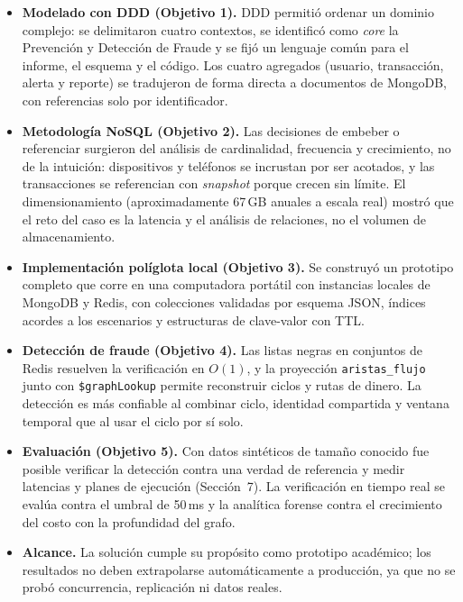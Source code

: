 \documentclass[11pt,a4paper]{article}
\begin{document}
	\begin{itemize}[leftmargin=2em]
		\item \textbf{Modelado con DDD (Objetivo 1).} DDD permitió ordenar un dominio complejo: se delimitaron cuatro contextos, se identificó como \textit{core} la Prevención y Detección de Fraude y se fijó un lenguaje común para el informe, el esquema y el código. Los cuatro agregados (usuario, transacción, alerta y reporte) se tradujeron de forma directa a documentos de MongoDB, con referencias solo por identificador.
		\item \textbf{Metodología NoSQL (Objetivo 2).} Las decisiones de embeber o referenciar surgieron del análisis de cardinalidad, frecuencia y crecimiento, no de la intuición: dispositivos y teléfonos se incrustan por ser acotados, y las transacciones se referencian con \textit{snapshot} porque crecen sin límite. El dimensionamiento (aproximadamente 67\,GB anuales a escala real) mostró que el reto del caso es la latencia y el análisis de relaciones, no el volumen de almacenamiento.
		\item \textbf{Implementación políglota local (Objetivo 3).} Se construyó un prototipo completo que corre en una computadora portátil con instancias locales de MongoDB y Redis, con colecciones validadas por esquema JSON, índices acordes a los escenarios y estructuras de clave-valor con TTL.
		\item \textbf{Detección de fraude (Objetivo 4).} Las listas negras en conjuntos de Redis resuelven la verificación en $O(1)$, y la proyección \texttt{aristas\_flujo} junto con \texttt{\$graphLookup} permite reconstruir ciclos y rutas de dinero. La detección es más confiable al combinar ciclo, identidad compartida y ventana temporal que al usar el ciclo por sí solo.
		\item \textbf{Evaluación (Objetivo 5).} Con datos sintéticos de tamaño conocido fue posible verificar la detección contra una verdad de referencia y medir latencias y planes de ejecución (Sección~7). La verificación en tiempo real se evalúa contra el umbral de 50\,ms y la analítica forense contra el crecimiento del costo con la profundidad del grafo.
		\item \textbf{Alcance.} La solución cumple su propósito como prototipo académico; los resultados no deben extrapolarse automáticamente a producción, ya que no se probó concurrencia, replicación ni datos reales.
	\end{itemize}
	
\end{document}
